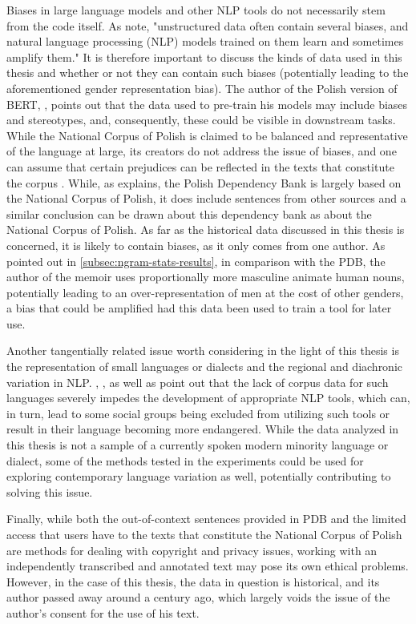 Biases in large language models and other NLP tools do not necessarily stem from the code itself. As \citet{garimella-etal-2021-intelligent} note, "unstructured data often contain several biases, and natural language processing (NLP) models trained on them learn and sometimes amplify them." It is therefore important to discuss the kinds of data used in this thesis and whether or not they can contain such biases (potentially leading to the aforementioned gender representation bias). The author of the Polish version of BERT, \citet{kłeczek_2021}, points out that the data used to pre-train his models may include biases and stereotypes, and, consequently, these could be visible in downstream tasks. While the National Corpus of Polish is claimed to be balanced and representative of the language at large, its creators do not address the issue of biases, and one can assume that certain prejudices can be reflected in the texts that constitute the corpus \citep{nkjp}. While, as \citet{wroblewska-2018-extended} explains, the Polish Dependency Bank is largely based on the National Corpus of Polish, it does include sentences from other sources and a similar conclusion can be drawn about this dependency bank as about the National Corpus of Polish. As far as the historical data discussed in this thesis is concerned, it is likely to contain biases, as it only comes from one author. As pointed out in \autoref{subsec:ngram-stats-results}, in comparison with the PDB, the author of the memoir uses proportionally more masculine animate human nouns, potentially leading to an over-representation of men at the cost of other genders, a bias that could be amplified had this data been used to train a tool for later use.  

Another tangentially related issue worth considering in the light of this thesis is the representation of small languages or dialects and the regional and diachronic variation in NLP. \citet{mcenery-etal-2000-corpus}, \citet{soria-etal-2016-fostering}, as well as  \citet{hovy-2018-social} point out that the lack of corpus data for such languages severely impedes the development of appropriate NLP tools, which can, in turn, lead to some social groups being excluded from utilizing such tools or result in their language becoming more endangered. While the data analyzed in this thesis is not a sample of a currently spoken modern minority language or dialect, some of the methods tested in the experiments could be used for exploring contemporary language variation as well, potentially contributing to solving this issue. 

Finally, while both the out-of-context sentences provided in PDB and the limited access that users have to the texts that constitute the National Corpus of Polish are methods for dealing with copyright and privacy issues, working with an independently transcribed and annotated text may pose its own ethical problems. However, in the case of this thesis, the data in question is historical, and its author passed away around a century ago, which largely voids the issue of the author's consent for the use of his text. 